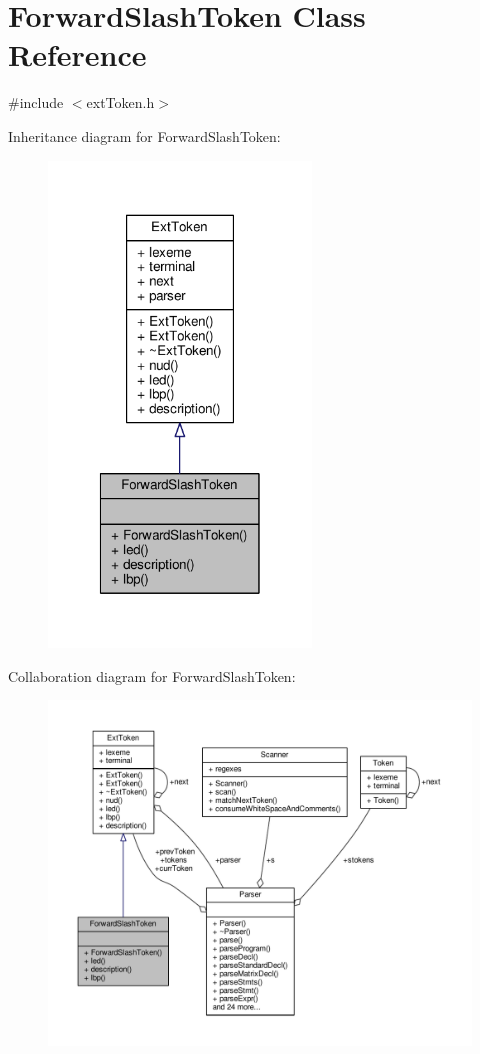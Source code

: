 \hypertarget{classForwardSlashToken}{\section{Forward\-Slash\-Token Class Reference}
\label{classForwardSlashToken}
}


{\ttfamily \#include $<$ext\-Token.\-h$>$}



Inheritance diagram for Forward\-Slash\-Token\-:\nopagebreak
\begin{figure}[H]
\begin{center}
\leavevmode
\includegraphics[width=198pt]{classForwardSlashToken__inherit__graph}
\end{center}
\end{figure}


Collaboration diagram for Forward\-Slash\-Token\-:\nopagebreak
\begin{figure}[H]
\begin{center}
\leavevmode
\includegraphics[width=350pt]{classForwardSlashToken__coll__graph}
\end{center}
\end{figure}
